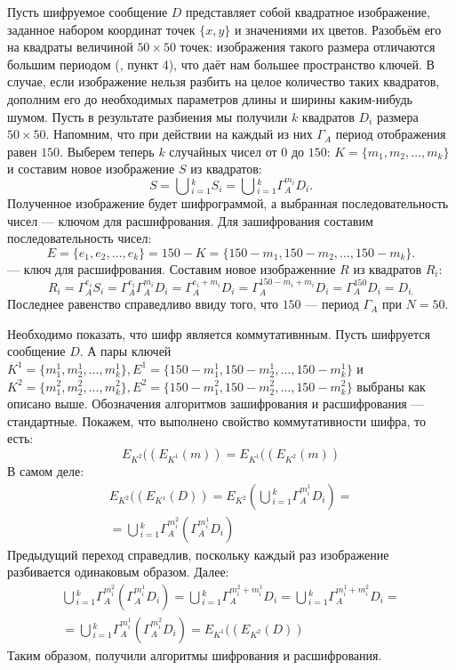 Пусть шифруемое сообщение $D$ представляет собой квадратное изображение, заданное набором координат точек $\{x,y\}$ и значениями их цветов. Разобьём его на квадраты величиной $50\times{}50$ точек: изображения такого размера отличаются большим периодом (\autocite{cat}, пункт 4), что даёт нам большее пространство ключей. В случае, если изображение нельзя разбить на целое количество таких квадратов, дополним его до необходимых параметров длины и ширины каким-нибудь шумом. 
Пусть в результате разбиения мы получили $k$ квадратов $D_{i}$ размера $50\times{}50$. Напомним, что при действии на каждый из них $\Gamma_{A}$ период отображения равен $150$. Выберем теперь $k$ случайных чисел от $0$ до $150$: $K = \{{m_{1},m_{2},\dots,m_{k}}\}$ и составим новое изображение $S$ из квадратов: 
$$S = \bigcup{}_{i = 1}^{k}S_{i} = \bigcup{}_{i = 1}^{k}\Gamma_{A}^{m_{i}}{D_{i}}.$$
Полученное изображение будет шифрограммой, а выбранная последовательность чисел --- ключом для расшифрования. Для зашифрования составим последовательность чисел: 
$$E = \{e_{1},e_{2},\dots{},e_{k}\} = 150 - K = \{150-m_{1},150-m_{2},\dots,150-m_{k}\}.$$
--- ключ для расшифрования. Составим новое изображенние $R$ из квадратов $R_{i}$:
$$R_{i} = \Gamma_{A}^{e_{i}}{S_{i}} =
\Gamma_{A}^{e_{i}}\Gamma_{A}^{m_{i}}{D_{i}} =
\Gamma_{A}^{e_{i}+m_{i}}{D_{i}} =
\Gamma_{A}^{150-m_{i}+m_{i}}{D_{i}} =
\Gamma_{A}^{150}{D_{i}} = 
D_{i.}$$
Последнее равенство справедливо ввиду того, что $150$ --- период $\Gamma_{A}$ при $N = 50$.

Необходимо показать, что шифр является коммутативнным. Пусть шифруется сообщение $D$. А пары ключей $K^{1} = \{{m_{1}^{1},m_{2}^{1},\dots,m_{k}^{1}}\}, E^{1} = \{{150 - m_{1}^{1},150 -m_{2}^{1},\dots,150 -m_{k}^{1}}\}$ и $K^{2} = \{{m_{1}^{2},m_{2}^{2},\dots,m_{k}^{2}}\}, E^{2} = \{150 -{m_{1}^{2},150 -m_{2}^{2},\dots,150 -m_{k}^{2}}\}$ выбраны как описано выше. Обозначения алгоритмов зашифрования и расшифрования --- стандартные. Покажем, что выполнено свойство коммутативности шифра, то есть:
$$
E_{K^{2}}((E_{K^{1}}(m)) = E_{K^{1}}((E_{K^{2}}(m))
$$
В самом деле:
\begin{gather*}
E_{K^{2}}((E_{K^{1}}(D)) = E_{K^{2}}(\bigcup{}_{i = 1}^{k}\Gamma_{A}^{m_{i}^{1}}{D_{i}}) = \\
=\bigcup{}_{i = 1}^{k}\Gamma_{A}^{m_{i}^{2}}(\Gamma_{A}^{m_{i}^{1}}{D_{i}}) 
\end{gather*}
Предыдущий переход справедлив, поскольку каждый раз изображение разбивается одинаковым образом. Далее:
\begin{gather*}
\bigcup{}_{i = 1}^{k}\Gamma_{A}^{m_{i}^{2}}(\Gamma_{A}^{m_{i}^{1}}{D_{i}})  = \bigcup{}_{i = 1}^{k}\Gamma_{A}^{m_{i}^{2}+m_{i}^{1}}{D_{i}} = \bigcup{}_{i = 1}^{k}\Gamma_{A}^{m_{i}^{1}+m_{i}^{2}}{D_{i}}=\\
= \bigcup{}_{i = 1}^{k}\Gamma_{A}^{m_{i}^{1}}(\Gamma_{A}^{m_{i}^{2}}{D_{i}}) =
E_{K^{1}}((E_{K^{2}}(D))
\end{gather*}
Таким образом, получили алгоритмы шифрования и расшифрования. 

